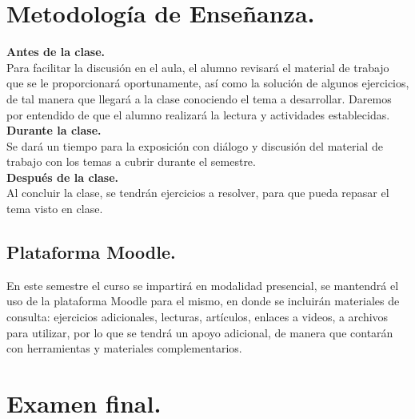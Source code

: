 \section{Metodología de Enseñanza.}

\noindent
\textbf{Antes de la clase.}
\\
Para facilitar la discusión en el aula, el alumno revisará el material de trabajo que se le proporcionará oportunamente, así como la solución de algunos ejercicios, de tal manera que llegará a la clase conociendo el tema a desarrollar. Daremos por entendido de que el alumno realizará la lectura y actividades establecidas.
\\
\textbf{Durante la clase.}
\\
Se dará un tiempo para la exposición con diálogo y discusión del material de trabajo con los temas a cubrir durante el semestre.
\\
\textbf{Después de la clase.}
\\
Al concluir la clase, se tendrán ejercicios a resolver, para que pueda repasar el tema visto en clase.

\subsection{Plataforma Moodle.}

En este semestre el curso se impartirá en modalidad presencial, se mantendrá el uso de la plataforma Moodle para el mismo, en donde se incluirán materiales de consulta: ejercicios adicionales, lecturas, artículos, enlaces a videos, a archivos para utilizar, por lo que se tendrá un apoyo adicional, de manera que contarán con herramientas y materiales complementarios.

\section{Examen final.}

